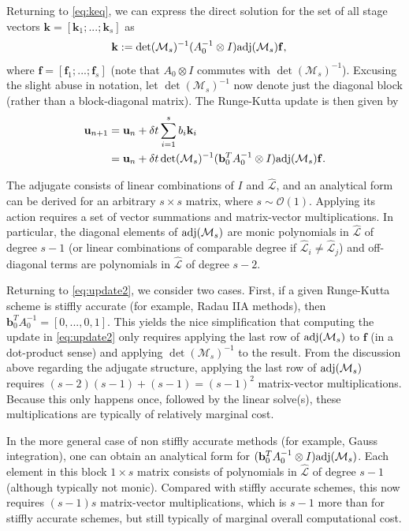 \documentclass[review]{siamart}
\begin{document}
Returning to \eqref{eq:keq}, we can express the direct solution for the set of all
stage vectors ${\mathbf{k}} = [\mathbf{k}_1; ...; \mathbf{k}_s]$ as
%
\begin{align*}
\mathbf{k} &:= \det(\mathcal{M}_s)^{-1}
	(A_0^{-1}\otimes I)\textnormal{adj}(\mathcal{M}_s)\mathbf{f},
\end{align*}
%
where $\mathbf{f} = [\mathbf{f}_1; ...; \mathbf{f}_s]$ (note that
$A_0\otimes I$ commutes with $\det(\mathcal{M}_s)^{-1}$). Excusing the slight
abuse in notation, let $\det(\mathcal{M}_s)^{-1}$ now denote just the diagonal
block (rather than a block-diagonal matrix). The Runge-Kutta update is then given by
%
\begin{align}\nonumber
\mathbf{u}_{n+1} & = \mathbf{u}_n + \delta t\sum_{i=1}^s b_i{\mathbf{k}}_i \\
& = \mathbf{u}_n + \delta t\det(\mathcal{M}_s)^{-1}
	(\mathbf{b}_0^TA_0^{-1}\otimes I)\textnormal{adj}(\mathcal{M}_s)\mathbf{f}.\label{eq:update2}
\end{align}
%

\begin{remark}
The adjugate consists of linear combinations of $I$ and $\widehat{\mathcal{L}}$, and an
analytical form can be derived for an arbitrary $s\times s$ matrix, where
$s\sim\mathcal{O}(1)$.
Applying its action requires a set of vector summations
and matrix-vector multiplications. In particular, the diagonal elements of
$\textnormal{adj}(\mathcal{M}_s)$ are monic polynomials in $\widehat{\mathcal{L}}$ of
degree $s-1$ (or linear combinations of comparable degree if
$\widehat{\mathcal{L}}_i\neq\widehat{\mathcal{L}}_j$)
and off-diagonal terms are polynomials in $\widehat{\mathcal{L}}$ of degree $s-2$.

Returning to \eqref{eq:update2}, we consider two cases. First, if a given Runge-Kutta
scheme is stiffly accurate (for example, Radau IIA methods),
then $\mathbf{b}_0^TA_0^{-1} = [0,...,0,1]$. This yields
the nice simplification that computing the update in \eqref{eq:update2} only requires
applying the last row of $\textnormal{adj}(\mathcal{M}_s)$ to $\mathbf{f}$ (in a
dot-product sense) and applying $\det(\mathcal{M}_s)^{-1}$ to the result. From
the discussion above regarding the adjugate structure, applying the last row of
$\textnormal{adj}(\mathcal{M}_s)$ requires $(s-2)(s-1) + (s-1) = (s-1)^2$ matrix-vector
multiplications. Because this only happens once, followed by the linear solve(s),
these multiplications are typically of relatively marginal cost.

In the more general case of non stiffly accurate methods (for example, Gauss integration),
one can obtain an analytical form for
$(\mathbf{b}_0^TA_0^{-1}\otimes I)\textnormal{adj}(\mathcal{M}_s)$. Each element in
this block $1\times s$ matrix consists of polynomials in $\widehat{\mathcal{L}}$ of
degree $s-1$ (although
typically not monic). Compared with stiffly accurate schemes, this now requires
$(s-1)s$ matrix-vector multiplications, which is $s-1$ more than for stiffly
accurate schemes, but still typically of marginal overall computational cost.
\end{remark}
\end{document}
